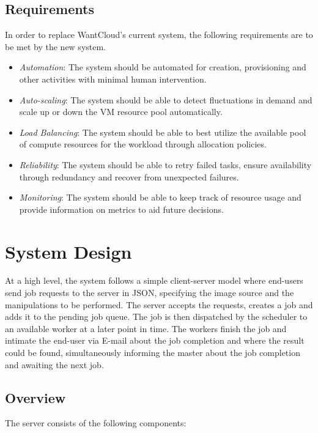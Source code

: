 \documentclass[a4paper]{IEEEtran}
\begin{document}
\subsection{Requirements}

In order to replace WantCloud's current system, the following requirements are to be met by the new system.

\begin{itemize}
  \item \emph{Automation}: The system should be automated for creation, provisioning and other activities
  with minimal human intervention.
  \item \emph{Auto-scaling}: The system should be able to detect fluctuations in demand and scale up or down the VM resource pool automatically.
  \item \emph{Load Balancing}: The system should be able to best utilize the available pool of compute resources
  for the workload through allocation policies.
  \item \emph{Reliability}: The system should be able to retry failed tasks, ensure availability through redundancy and recover from unexpected failures.
  \item \emph{Monitoring}: The system should be able to keep track of resource usage and provide information
  on metrics to aid future decisions.
\end{itemize}

\section{System Design} \label{system_design}

At a high level, the system follows a simple client-server model where end-users send job requests to the server
in JSON, specifying the image source and the manipulations to be performed. The server accepts the requests, creates
a job and adds it to the pending job queue. The job is then dispatched by the scheduler to an available worker at a later point in time. The workers finish the job and intimate the end-user via E-mail about the job completion and 
where the result could be found, simultaneously informing the master about the job completion and awaiting the next job.

\subsection{Overview}

 The server consists of the following components:
\end{document}
